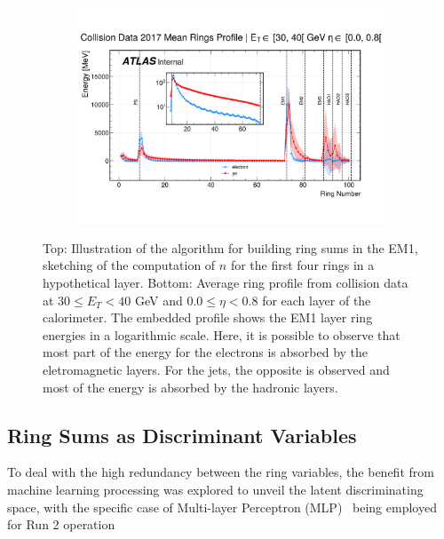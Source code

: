 \begin{figure}[!ht]
\begin{center}
  \begin{subfigure}[c]{.7\textwidth}
  \centering
  \includegraphics[width=1.1\textwidth]{sections/03_ringer/figures/reco_steps/data17_zee_mean_rings_profiles_et2_eta0.pdf}
  \caption{}
  \label{fig:building_rings_b}
  \end{subfigure}
  \caption{
  Top: Illustration of the \fastcalo algorithm for building ring sums in the EM1, sketching of the computation of $n$ for the first four rings in a hypothetical layer.
  	Bottom: Average ring profile from collision data at $30 \leq E_T < 40$ GeV and $0.0 \leq \eta < 0.8$ for each layer of the calorimeter. The embedded profile shows the EM1 layer ring energies in a logarithmic scale. Here, it is possible to observe that most part of the energy for the electrons is absorbed by the eletromagnetic layers. For the jets, the opposite is observed and most of the energy is absorbed by the hadronic layers.}
  \end{center}
\end{figure}





\subsection{Ring Sums as Discriminant Variables}\label{ssec:ringer_id}



To deal with the high redundancy between the ring variables, the benefit from machine learning processing was explored to unveil the latent discriminating space, with the specific case of Multi-layer Perceptron (MLP)~\cite{haykin_2008} being employed for Run 2 operation

